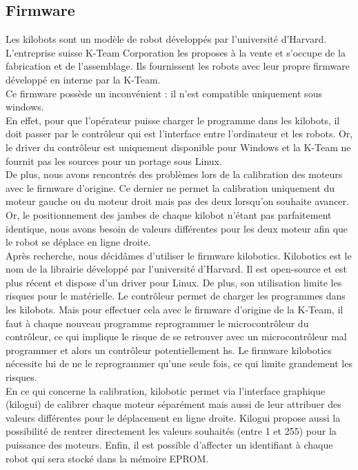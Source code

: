 \documentclass[a4paper,8pt]{report}
\begin{document}
\subsection*{Firmware}\label{subsec:name}

Les kilobots sont un mod\`ele de robot d\'evelopp\'es par l'universit\'e d'Harvard. L'entreprise suisse K-Team Corporation les proposes \`a la vente et s'occupe de la fabrication et de l'assemblage. Ils fournissent les robots avec leur propre firmware d\'evelopp\'e en interne par la K-Team. \\
Ce firmware poss\`ede un inconv\'enient : il n'est compatible uniquement sous windows. \\
En effet, pour que l'op\'erateur puisse charger le programme dans les kilobots, il doit passer par le contr\^oleur qui est l'interface entre l'ordinateur et les robots. Or, le driver du contr\^oleur est uniquement disponible pour Windows et la K-Team ne fournit pas les sources pour un portage sous Linux. \\
De plus, nous avons rencontr\'es des probl\`emes lors de la calibration des moteurs avec le firmware d'origine. Ce dernier ne permet la calibration uniquement du moteur gauche ou du moteur droit mais pas des deux lorsqu'on souhaite avancer. Or, le positionnement des jambes de chaque kilobot n'\'etant pas parfaitement identique, nous avons besoin de valeurs diff\'erentes pour les deux moteur afin que le robot se d\'eplace en ligne droite.\\

\medskip
Apr\`es recherche, nous d\'ecid\^ames d'utiliser le firmware kilobotics. Kilobotics est le nom de la librairie d\'evelopp\'e par l'universit\'e d'Harvard. Il est open-source et est plus r\'ecent et dispose d'un driver pour Linux. De plus, son utilisation limite les risques pour le mat\'erielle. Le contr\^oleur permet de charger les programmes dans les kilobots. Mais pour effectuer cela avec le firmware d'origine de la K-Team, il faut \`a chaque nouveau programme reprogrammer le microcontr\^oleur du contr\^oleur, ce qui implique le risque de se retrouver avec un microcontr\^oleur mal programmer et alors un contr\^oleur potentiellement hs. Le firmware kilobotics n\'ecessite lui de ne le reprogrammer qu'une seule fois, ce qui limite grandement les risques. \\
En ce qui concerne la calibration, kilobotic permet via l'interface graphique (kilogui) de calibrer chaque moteur s\'epar\'ement mais aussi de leur attribuer des valeurs diff\'erentes pour le d\'eplacement en ligne droite. Kilogui propose aussi la possibilit\'e de rentrer directement les valeurs souhait\'es (entre 1 et 255) pour la puissance des moteurs. Enfin, il est possible d'affecter un identifiant \`a chaque robot qui sera stock\'e dans la m\'emoire EPROM.\\
\end{document}
